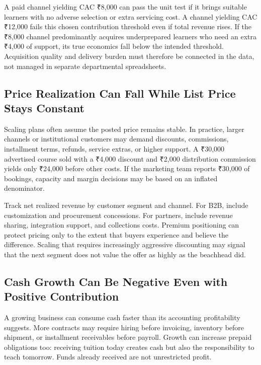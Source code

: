 A paid channel yielding CAC ₹8,000 can pass the unit test if it brings suitable learners with no adverse selection or extra servicing cost. A channel yielding CAC ₹12,000 fails this chosen contribution threshold even if total revenue rises. If the ₹8,000 channel predominantly acquires underprepared learners who need an extra ₹4,000 of support, its true economics fall below the intended threshold. Acquisition quality and delivery burden must therefore be connected in the data, not managed in separate departmental spreadsheets.

\subsection{Price Realization Can Fall While List Price Stays Constant}
\label{sec:price_realization_erosion}

Scaling plans often assume the posted price remains stable. In practice, larger channels or institutional customers may demand discounts, commissions, installment terms, refunds, service extras, or higher support. A ₹30,000 advertised course sold with a ₹4,000 discount and ₹2,000 distribution commission yields only ₹24,000 before other costs. If the marketing team reports ₹30,000 of bookings, capacity and margin decisions may be based on an inflated denominator.

Track net realized revenue by customer segment and channel. For B2B, include customization and procurement concessions. For partners, include revenue sharing, integration support, and collections costs. Premium positioning can protect pricing only to the extent that buyers experience and believe the difference. Scaling that requires increasingly aggressive discounting may signal that the next segment does not value the offer as highly as the beachhead did.

\subsection{Cash Growth Can Be Negative Even with Positive Contribution}
\label{sec:cash_growth_negative_working_capital}

A growing business can consume cash faster than its accounting profitability suggests. More contracts may require hiring before invoicing, inventory before shipment, or installment receivables before payroll. Growth can increase prepaid obligations too: receiving tuition today creates cash but also the responsibility to teach tomorrow. Funds already received are not unrestricted profit.

